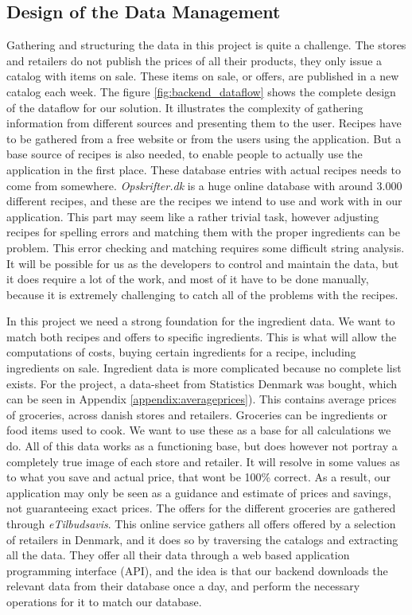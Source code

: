 \subsection{Design of the Data Management}\label{subsec:backend_datamanagement}

Gathering and structuring the data in this project is quite a challenge. The stores and retailers do not publish the prices of all their products, they only issue a catalog with items on sale. These items on sale, or offers, are published in a new catalog each week. The figure \ref{fig:backend_dataflow} shows the complete design of the dataflow for our solution. It illustrates the complexity of gathering information from different sources and presenting them to the user. Recipes have to be gathered from a free website or from the users using the application. But a base source of recipes is also needed, to enable people to actually use the application in the first place. These database entries with actual recipes needs to come from somewhere. \textit{Opskrifter.dk} is a huge online database with around 3.000 different recipes, and these are the recipes we intend to use and work with in our application. This part may seem like a rather trivial task, however adjusting recipes for spelling errors and matching them with the proper ingredients can be problem. This error checking and matching requires some difficult string analysis. It will be possible for us as the developers to control and maintain the data, but it does require a lot of the work, and most of it have to be done manually, because it is extremely challenging to catch all of the problems with the recipes.

In this project we need a strong foundation for the ingredient data. We want to match both recipes and offers to specific ingredients. This is what will allow the computations of costs, buying certain ingredients for a recipe, including ingredients on sale. Ingredient data is more complicated because no complete list exists. For the project, a data-sheet from Statistics Denmark was bought, which can be seen in Appendix \ref{appendix:averageprices}). This contains average prices of groceries, across danish stores and retailers. Groceries can be ingredients or food items used to cook. We want to use these as a base for all calculations we do. All of this data works as a functioning base, but does however not portray a completely true image of each store and retailer. It will resolve in some values as to what you save and actual price, that wont be 100\% correct. As a result, our application may only be seen as a guidance and estimate of prices and savings, not guaranteeing exact prices. The offers for the different groceries are gathered through \textit{eTilbudsavis}. This online service gathers all offers offered by a selection of retailers in Denmark, and it does so by traversing the catalogs and extracting all the data. They offer all their data through a web based application programming interface (API), and the idea is that our backend downloads the relevant data from their database once a day, and perform the necessary operations for it to match our database. 

